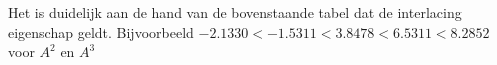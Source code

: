 \documentclass[]{article}
\begin{document}
\begin{table}
\noindent{}
\caption{Eigenwaarden van de principiele submatrices van A}
\label{tabelOpgave4}
\end{table}

Het is duidelijk aan de hand van de bovenstaande tabel dat de interlacing eigenschap geldt. Bijvoorbeeld $-2.1330 < -1.5311 < 3.8478 < 6.5311 < 8.2852$ voor $A^{2}$ en $A^{3}$
\end{document}
